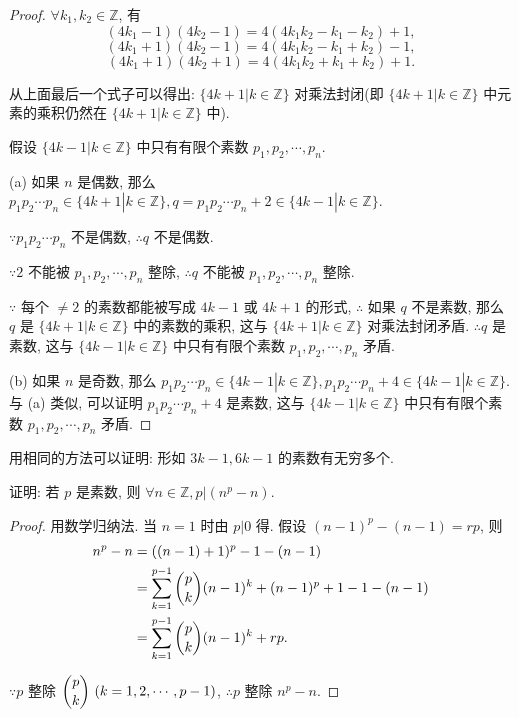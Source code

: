 \documentclass{ctexart}
\begin{document}
\begin{proof}
    $\forall k_1,k_2\in\mathbb{Z}$, 有
    \[(4k_1-1)(4k_2-1)=4(4k_1k_2-k_1-k_2)+1,\]
    \[(4k_1+1)(4k_2-1)=4(4k_1k_2-k_1+k_2)-1,\]
    \[(4k_1+1)(4k_2+1)=4(4k_1k_2+k_1+k_2)+1.\]

    从上面最后一个式子可以得出: $\{4k+1|k\in\mathbb{Z}\}$ 对乘法封闭(即 $\{4k+1|k\in\mathbb{Z}\}$ 中元素的乘积仍然在 $\{4k+1|k\in\mathbb{Z}\}$ 中).

    假设 $\{4k-1|k\in\mathbb{Z}\}$ 中只有有限个素数 $p_1,p_2,\cdots,p_n$.
    
    (a) 如果 $n$ 是偶数, 那么 $p_1p_2\cdots p_n\in\{4k+1|k\in\mathbb{Z}\},q=p_1p_2\cdots p_n+2\in\{4k-1|k\in\mathbb{Z}\}$.
    
    $\because p_1p_2\cdots p_n$ 不是偶数, $\therefore q$ 不是偶数.
    
    $\because2$ 不能被 $p_1,p_2,\cdots,p_n$ 整除, $\therefore q$ 不能被 $p_1,p_2,\cdots,p_n$ 整除.

    $\because$ 每个 $\neq2$ 的素数都能被写成 $4k-1$ 或 $4k+1$ 的形式, $\therefore$ 如果 $q$ 不是素数, 那么 $q$ 是 $\{4k+1|k\in\mathbb{Z}\}$ 中的素数的乘积, 这与 $\{4k+1|k\in\mathbb{Z}\}$ 对乘法封闭矛盾. $\therefore q$ 是素数, 这与 $\{4k-1|k\in\mathbb{Z}\}$ 中只有有限个素数 $p_1,p_2,\cdots,p_n$ 矛盾.

    (b) 如果 $n$ 是奇数, 那么 $p_1p_2\cdots p_n\in\{4k-1|k\in\mathbb{Z}\},p_1p_2\cdots p_n+4\in\{4k-1|k\in\mathbb{Z}\}$. 与 (a) 类似, 可以证明 $p_1p_2\cdots p_n+4$ 是素数, 这与 $\{4k-1|k\in\mathbb{Z}\}$ 中只有有限个素数 $p_1,p_2,\cdots,p_n$ 矛盾.
\end{proof}
\begin{note}
    用相同的方法可以证明: 形如 $3k-1,6k-1$ 的素数有无穷多个.
\end{note}
\addtocounter{exercise}{2}
\begin{exercise}%
    证明: 若 $p$ 是素数, 则 $\forall n\in\mathbb{Z},p|(n^p-n)$.
\end{exercise}
\begin{proof}
    用数学归纳法. 当 $n=1$ 时由 $p|0$ 得. 假设 $(n-1)^p-(n-1)=rp$, 则
    \begin{align*}
        n^p-n & =((n-1)+1)^p-1-(n-1) \\
        & =\sum\limits_{k=1}^{p-1}\dbinom{p}{k}(n-1)^k+(n-1)^p+1-1-(n-1) \\
        & =\sum\limits_{k=1}^{p-1}\dbinom{p}{k}(n-1)^k+rp.
    \end{align*}

    $\because p$ 整除 $\dbinom{p}{k}\ (k=1,2,\cdots,p-1)$, $\therefore p$ 整除 $n^p-n$.
\end{proof}
\end{document}
